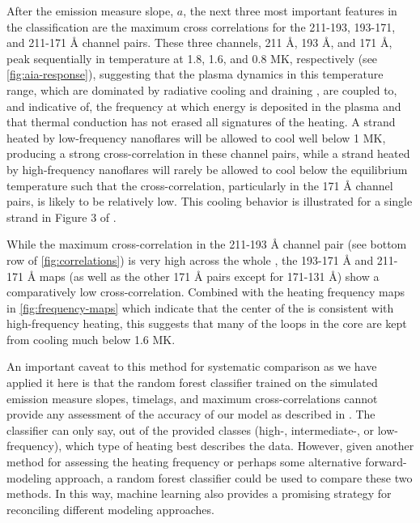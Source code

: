 After the emission measure slope, $a$, the next three most important features in the classification are the maximum cross correlations for the 211-193, 193-171, and 211-171 \AA{} channel pairs. These three channels, 211 \AA{}, 193 \AA{}, and 171 \AA{}, peak sequentially in temperature at 1.8, 1.6, and 0.8 MK, respectively (see \autoref{fig:aia-response}), suggesting that the plasma dynamics in this temperature range, which are dominated by radiative cooling and draining \citep[e.g.][]{bradshaw_cooling_2005,bradshaw_cooling_2010,bradshaw_new_2010}, are coupled to, and indicative of, the frequency at which energy is deposited in the plasma and that thermal conduction has not erased all signatures of the heating. A strand heated by low-frequency nanoflares will be allowed to cool well below 1 MK, producing a strong cross-correlation in these channel pairs, while a strand heated by high-frequency nanoflares will rarely be allowed to cool below the equilibrium temperature such that the cross-correlation, particularly in the 171 \AA{} channel pairs, is likely to be relatively low. This cooling behavior is illustrated for a single strand in Figure 3 of .

While the maximum cross-correlation in the 211-193 \AA{} channel pair (see bottom row of \autoref{fig:correlations}) is very high across the whole \AR{}, the 193-171 \AA{} and 211-171 \AA{} maps (as well as the other 171 \AA{} pairs except for 171-131 \AA{}) show a comparatively low cross-correlation. Combined with the heating frequency maps in \autoref{fig:frequency-maps} which indicate that the center of the \AR{} is consistent with high-frequency heating, this suggests that many of the loops in the core are kept from cooling much below 1.6 MK.

An important caveat to this method for systematic comparison as we have applied it here is that the random forest classifier trained on the simulated emission measure slopes, timelags, and maximum cross-correlations cannot provide any assessment of the accuracy of our model as described in . The classifier can only say, out of the provided classes (high-, intermediate-, or low-frequency), which type of heating best describes the data. However, given another method for assessing the heating frequency or perhaps some alternative forward-modeling approach, a random forest classifier could be used to compare these two methods. In this way, machine learning also provides a promising strategy for reconciling different modeling approaches.
